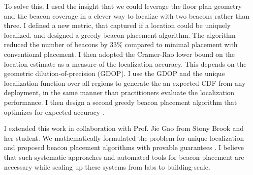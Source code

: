 \documentclass[10pt]{article}
\begin{document}


To solve this, I used the insight that we could leverage the floor plan geometry and the beacon coverage in a clever way to localize with two beacons rather than three. %
I defined a new metric, that captured if a location could be uniquely localized. %
and designed a greedy beacon placement algorithm. %
The algorithm reduced the number of beacons by $33\%$ compared to minimal placement with conventional placement. 
I then adopted the Cramer-Rao lower bound on the location estimate as a measure of the localization accuracy. This depends on the geometric dilution-of-precision (GDOP). %
I use the GDOP and the unique localization function over all regions to generate the an expected CDF from any deployment, in the same manner than practitioners evaluate the localization performance. I then design a second greedy beacon placement algorithm that optimizes for expected accuracy \cite{rajagopal2016beacon}.  

I extended this work in collaboration with
Prof. Jie Gao from Stony Brook and her student. We mathematically
formulated the problem for unique localization and proposed beacon placement
algorithms with provable guarantees \cite{beaconplacementtheory}. I believe that such systematic approaches and automated tools for beacon
placement are necessary while scaling up these systems from labs to
building-scale. 
\end{document}
